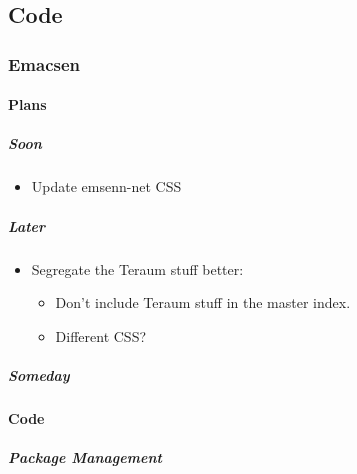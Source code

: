 \documentclass[11pt]{article}
\begin{document}
\subsection*{Code}
\label{sec:org2f56d0f}
\startcontents[level-2]
\subsubsection*{Emacsen}
\label{sec:orge550cf6}
\startcontents[level-3]
\paragraph*{Plans}
\label{sec:org22cf622}
\subparagraph*{Soon}
\label{sec:org2e2a429}
\begin{itemize}
\item Update emsenn-net CSS
\end{itemize}
\subparagraph*{Later}
\label{sec:orgb427e45}
\begin{itemize}
\item Segregate the Teraum stuff better:
\begin{itemize}
\item Don't include Teraum stuff in the master index.
\item Different CSS?
\end{itemize}
\end{itemize}
\subparagraph*{Someday}
\label{sec:orgaf5d810}
\paragraph*{Code}
\label{sec:org96c6c01}
\subparagraph*{Package Management}
\label{sec:org71be01f}
\end{document}
